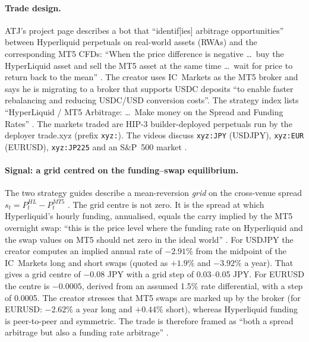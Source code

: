 \documentclass[11pt,a4paper]{article}
\begin{document}
\paragraph{Trade design.}
ATJ's project page describes a bot that ``identif[ies] arbitrage opportunities'' between Hyperliquid perpetuals on real-world assets (RWAs) and the corresponding MT5 CFDs: ``When the price difference is negative \ldots\ buy the HyperLiquid asset and sell the MT5 asset at the same time \ldots\ wait for price to return back to the mean'' \citep{atj_project}.
The creator uses IC~Markets as the MT5 broker and says he is migrating to a broker that supports USDC deposits ``to enable faster rebalancing and reducing USDC/USD conversion costs''.
The strategy index lists ``HyperLiquid / MT5 Arbitrage: \ldots\ Make money on the Spread and Funding Rates'' \citep{atj_strategies}.
The markets traded are HIP-3 builder-deployed perpetuals run by the deployer trade.xyz (prefix \texttt{xyz:}). The videos discuss \texttt{xyz:JPY} (USDJPY), \texttt{xyz:EUR} (EURUSD), \texttt{xyz:JP225} and an S\&P~500 market \citep{atj_yt_bot,atj_yt_jpy,atj_yt_eur}.

\paragraph{Signal: a grid centred on the funding--swap equilibrium.}
The two strategy guides describe a mean-reversion \emph{grid} on the cross-venue spread $s_t = P^{HL}_t - P^{MT5}_t$ \citep{atj_yt_jpy,atj_yt_eur}.
The grid centre is not zero. It is the spread at which Hyperliquid's hourly funding, annualised, equals the carry implied by the MT5 overnight swap: ``this is the price level where the funding rate on Hyperliquid and the swap values on MT5 should net zero in the ideal world'' \citep{atj_yt_jpy}.
For USDJPY the creator computes an implied annual rate of $-2.91\%$ from the midpoint of the IC~Markets long and short swaps (quoted as $+1.9\%$ and $-3.92\%$ a year). That gives a grid centre of $-0.08$ JPY with a grid step of 0.03--0.05 JPY.
For EURUSD the centre is $-0.0005$, derived from an assumed 1.5\% rate differential, with a step of 0.0005.
The creator stresses that MT5 swaps are marked up by the broker (for EURUSD: $-2.62\%$ a year long and $+0.44\%$ short), whereas Hyperliquid funding is peer-to-peer and symmetric.
The trade is therefore framed as ``both a spread arbitrage but also a funding rate arbitrage'' \citep{atj_yt_eur}.
\end{document}
